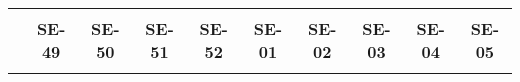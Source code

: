 \begin{tabular}{lccccccccc}
	\textbf{}              & \multicolumn{1}{l}{}                        & \multicolumn{1}{l}{}      & \multicolumn{1}{l}{}                         & \multicolumn{1}{l}{}                         & \multicolumn{1}{l}{}                         & \multicolumn{1}{l}{}                        & \multicolumn{1}{l}{}                         & \multicolumn{1}{l}{}                         & \multicolumn{1}{l}{}     \\
	\textbf{}                                                                               
	&\textbf{SE-49}
	&\textbf{SE-50}								&\textbf{SE-51}					  &\textbf{SE-52}
	&\textbf{SE-01}								&\textbf{SE-02}					 &\textbf{SE-03}
	&\textbf{SE-04}								&\textbf{SE-05}\\
		\textbf{}              
	  	

\end{tabular}
